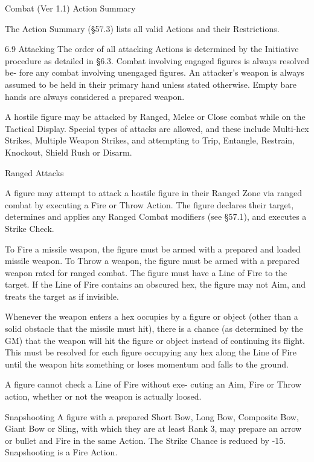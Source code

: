 \begin{Chapter}{Combat (Ver 1.1)}
Action Summary 

The Action Summary (§57.3) lists all valid Actions 
and their Restrictions. 

6.9 Attacking 
The order of all attacking Actions is determined by 
the Initiative procedure as detailed in §6.3. Combat 
involving  engaged  figures  is  always  resolved  be-
fore  any  combat  involving  unengaged  figures.  An 
attacker’s weapon is always assumed to be held in 
their  primary  hand  unless stated  otherwise.  Empty 
bare  hands  are  always  considered  a  prepared 
weapon. 

A hostile figure may be attacked by Ranged, Melee 
or  Close  combat  while  on  the  Tactical  Display. 
Special  types  of  attacks  are  allowed,  and  these 
include  Multi-hex  Strikes,  Multiple  Weapon 
Strikes, and attempting to Trip, Entangle, Restrain, 
Knockout, Shield Rush or Disarm. 

Ranged Attacks 

A  figure  may  attempt  to  attack  a  hostile  figure  in 
their Ranged Zone via ranged combat by executing 
a  Fire  or  Throw  Action.  The  figure  declares  their 
target, determines and applies any Ranged Combat 
modifiers (see §57.1), and executes a Strike Check. 

To Fire a missile weapon, the figure must be armed 
with  a  prepared  and  loaded  missile  weapon.  To 
Throw a  weapon, the figure must be armed with a 
prepared  weapon  rated  for  ranged  combat.  The 
figure must have a Line of Fire to the target. If the 
Line  of  Fire  contains  an  obscured  hex,  the  figure 
may not Aim, and treats the target as if invisible. 

Whenever  the  weapon  enters  a  hex  occupies  by  a 
figure or object (other than a solid obstacle that the 
missile  must hit),  there  is  a  chance  (as determined 
by  the  GM)  that  the  weapon  will  hit  the  figure  or 
object instead of continuing its flight. This must be 
resolved  for  each  figure  occupying  any  hex  along 
the Line of Fire until the weapon hits something or 
loses momentum and falls to the ground. 

A  figure  cannot  check  a  Line  of  Fire  without  exe-
cuting  an  Aim,  Fire  or  Throw  action,  whether  or 
not the weapon is actually loosed. 

Snapshooting A figure with a prepared Short Bow, 
Long  Bow,  Composite  Bow,  Giant  Bow  or  Sling, 
with  which  they  are  at  least  Rank  3,  may  prepare 
an arrow or bullet and Fire in the same Action. The 
Strike Chance is reduced by -15. Snapshooting is a 
Fire Action. 


\end{Chapter}
